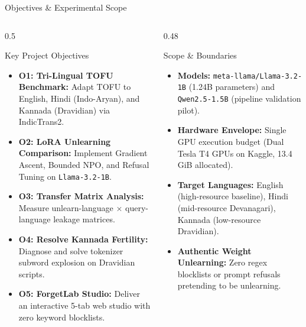 \documentclass[aspectratio=169,10pt]{beamer}
\begin{document}
\begin{frame}{Objectives \& Experimental Scope}
  \begin{columns}[T]
    \begin{column}{0.5\textwidth}
      \begin{block}{Key Project Objectives}
        \begin{itemize}\scriptsize
          \item \textbf{O1: Tri-Lingual TOFU Benchmark:} Adapt TOFU to English, Hindi (Indo-Aryan), and Kannada (Dravidian) via IndicTrans2.
          \item \textbf{O2: LoRA Unlearning Comparison:} Implement Gradient Ascent, Bounded NPO, and Refusal Tuning on \texttt{Llama-3.2-1B}.
          \item \textbf{O3: Transfer Matrix Analysis:} Measure unlearn-language $\times$ query-language leakage matrices.
          \item \textbf{O4: Resolve Kannada Fertility:} Diagnose and solve tokenizer subword explosion on Dravidian scripts.
          \item \textbf{O5: ForgetLab Studio:} Deliver an interactive 5-tab web studio with zero keyword blocklists.
        \end{itemize}
      \end{block}
    \end{column}
    \begin{column}{0.48\textwidth}
      \begin{block}{Scope \& Boundaries}
        \begin{itemize}\scriptsize
          \item \textbf{Models:} \texttt{meta-llama/Llama-3.2-1B} (1.24B parameters) and \texttt{Qwen2.5-1.5B} (pipeline validation pilot).
          \item \textbf{Hardware Envelope:} Single GPU execution budget (Dual Tesla T4 GPUs on Kaggle, 13.4 GiB allocated).
          \item \textbf{Target Languages:} English (high-resource baseline), Hindi (mid-resource Devanagari), Kannada (low-resource Dravidian).
          \item \textbf{Authentic Weight Unlearning:} Zero regex blocklists or prompt refusals pretending to be unlearning.
        \end{itemize}
      \end{block}
    \end{column}
  \end{columns}
\end{frame}
\end{document}
